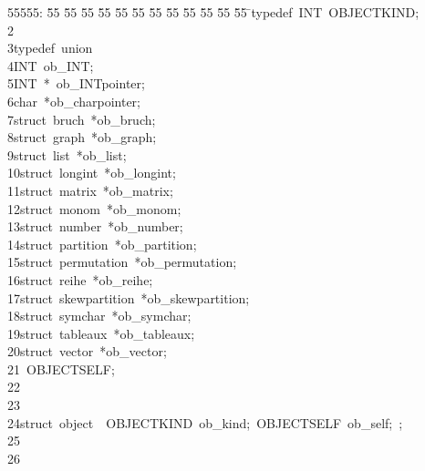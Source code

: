 %
%
\begin{tabbing}
55555: \= 55 \= 55 \= 55 \= 55 \= 55 \= 55 \= 55 \= 55 \= 55 \= 55 \= 55 \= 55 \= \>typedef\ INT\ OBJECTKIND;\\[0pt]
2\>\\[0pt]
3\>typedef\ union\ \\[0pt]
4\>\>INT\ ob\_INT;\\[0pt]
5\>\>INT\ *\ ob\_INTpointer;\\[0pt]
6\>\>char\ *ob\_charpointer;\\[0pt]
7\>\>struct\ bruch\ *ob\_bruch;\\[0pt]
8\>\>struct\ graph\ *ob\_graph;\\[0pt]
9\>\>struct\ list\ *ob\_list;\\[0pt]
10\>\>struct\ longint\ *ob\_longint;\\[0pt]
11\>\>struct\ matrix\ *ob\_matrix;\\[0pt]
12\>\>struct\ monom\ *ob\_monom;\\[0pt]
13\>\>struct\ number\ *ob\_number;\\[0pt]
14\>\>struct\ partition\ *ob\_partition;\\[0pt]
15\>\>struct\ permutation\ *ob\_permutation;\\[0pt]
16\>\>struct\ reihe\ *ob\_reihe;\\[0pt]
17\>\>struct\ skewpartition\ *ob\_skewpartition;\\[0pt]
18\>\>struct\ symchar\ *ob\_symchar;\\[0pt]
19\>\>struct\ tableaux\ *ob\_tableaux;\\[0pt]
20\>\>struct\ vector\ *ob\_vector;\\[0pt]
21\>\>\ OBJECTSELF;\\[0pt]
22\>\\[0pt]
23\>\\[0pt]
24\>struct\ object\ \ OBJECTKIND\ ob\_kind;\ OBJECTSELF\ ob\_self;\ ;\\[0pt]
25\>\\[0pt]
26\>\end{tabbing}
